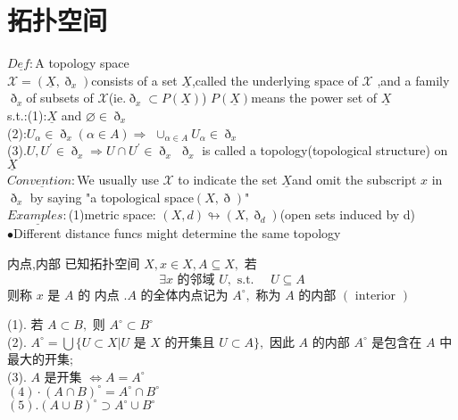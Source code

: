 \documentclass[cn,11pt,chinese,black]{elegantbook}
\begin{document}
\chapter{拓扑空间}
\noindent$\underline{Def:}$A topology space \\
 $\mathcal{X}=(\underline{X},\eth_{x})$consists of a set $\underline{X}$,called the underlying space of $\mathcal{X}$ ,and a family $\eth_{x}$of subsets of $\mathcal{X}$(ie.$\eth_{x}\subset P(\underline{X})$)
 $P(\underline{X})$means the power set of $\underline{X}$\\
 s.t.:(1):$\underline{X}$ and $\varnothing \in \eth_{x}$\\
 (2):$U_{\alpha}\in \eth_{x}(\alpha \in A) \Rightarrow$
 $\cup_{\alpha \in A}U_{\alpha} \in \eth_{x}$\\
 (3).$U,U^{\prime}\in \eth_{x} \Rightarrow U \cap U^{\prime} \in \eth_{x}$
 $\eth_{x}$ is called a topology(topological structure) on $\underline{X}$\\
$\underline{Convention:}$We usually use $\mathcal{X}$ to indicate the set $\underline{X}$and omit the subscript $x$ in $\eth_{x}$ by saying "a topological space$(X,\eth)$"\\
$\underline{Examples:}$(1)metric space:
$(X,d) \looparrowright(X,\eth_{d})$(open sets induced by d)\\
$\bullet$Different distance funcs might determine the same topology
\begin{definition}{内点,内部}
\noindent	 已知拓扑空间 $X, x \in X, A \subseteq X,$ 若
	\[
	\exists x \text { 的邻域 } U, \text { s.t. } \quad U \subseteq A
	\]
	则称 $x$ 是 $A$ 的 内点 $. A$ 的全体内点记为 $A^{\circ},$ 称为 $A$ 的内部 $(\text { interior })$
\end{definition}
\begin{property}
(1). 若 $A \subset B,$ 则 $A^{\circ} \subset B^{\circ}$ \\
(2). $A^{\circ}=\bigcup\{U \subset X | U \text { 是 } X \text { 的开集且 } U \subset A\},$ 因此 $A$ 的内部 $A^{\circ}$ 是包含在
$A$ 中最大的开集;\\
(3). $A$ 是开集 $\Longleftrightarrow A=A^{\circ}$\\
$(4) \cdot(A \cap B)^{\circ}=A^{\circ} \cap B^{\circ}$ \\
$(5) .(A \cup B)^{\circ} \supset A^{\circ} \cup B^{\circ}$ \\
\end{property}
\end{document}
